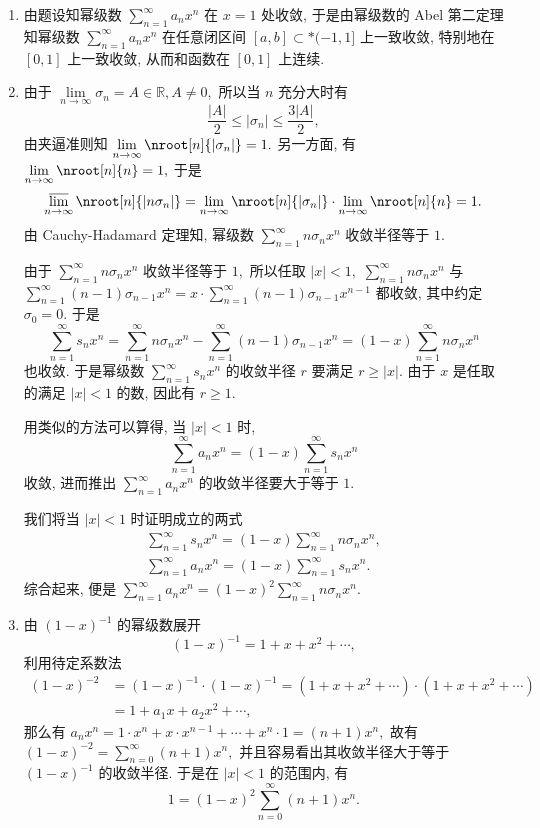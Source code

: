 \begin{solution}
\begin{enumerate}
\item 由题设知幂级数 $\sum\limits_{n=1}^{\infty} a_nx^n$ 在 $x = 1$ 处收敛, 于是由幂级数的 Abel 第二定理知幂级数 $\sum\limits_{n=1}^{\infty} a_nx^n$ 在任意闭区间 $[a, b] \subset* (-1, 1]$ 上一致收敛, 特别地在 $[0, 1]$ 上一致收敛, 从而和函数在 $[0, 1]$ 上连续.
\item 由于 $\lim\limits_{n\to\infty} \sigma_n = A \in \mathbb{R}, A \neq 0,$ 所以当 $n$ 充分大时有
\[\dfrac{\lvert A \rvert}{2} \leqslant \lvert \sigma_n \rvert \leqslant \dfrac{3\lvert A \rvert}{2},\]
由夹逼准则知 $\lim\limits_{n\to\infty} \nroot[n]{\lvert \sigma_n \rvert} = 1.$ 另一方面, 有 $\lim\limits_{n\to\infty} \nroot[n]{n} = 1,$ 于是
\[\varlimsup_{n\to\infty} \nroot[n]{\lvert n\sigma_n \rvert} = \lim\limits_{n\to\infty} \nroot[n]{\lvert \sigma_n \rvert} \cdot \lim\limits_{n\to\infty} \nroot[n]{n} = 1.\]
由 Cauchy-Hadamard 定理知, 幂级数 $\sum\limits_{n=1}^{\infty} n\sigma_n x^n$ 收敛半径等于 $1.$

由于 $\sum\limits_{n=1}^{\infty} n\sigma_n x^n$ 收敛半径等于 $1,$ 所以任取 $\lvert x \rvert < 1,$ $\sum\limits_{n=1}^{\infty} n\sigma_n x^n$ 与 $\sum\limits_{n=1}^{\infty} (n-1) \sigma_{n-1} x^n = x \cdot \sum\limits_{n=1}^{\infty} (n-1) \sigma_{n-1} x^{n-1}$ 都收敛, 其中约定 $\sigma_0 = 0.$ 于是
\[\sum\limits_{n=1}^{\infty} s_n x^n = \sum\limits_{n=1}^{\infty} n\sigma_n x^n - \sum\limits_{n=1}^{\infty} (n-1) \sigma_{n-1} x^n = (1-x) \sum\limits_{n=1}^{\infty} n\sigma_n x^n\]
也收敛. 于是幂级数 $\sum\limits_{n=1}^{\infty} s_n x^n$ 的收敛半径 $r$ 要满足 $r \geqslant \lvert x \rvert.$ 由于 $x$ 是任取的满足 $\lvert x \rvert < 1$ 的数, 因此有 $r \geqslant 1.$

用类似的方法可以算得, 当 $\lvert x \rvert < 1$ 时,
\[\sum\limits_{n=1}^{\infty} a_n x^n = (1 - x) \sum\limits_{n=1}^{\infty} s_n x^n\]
收敛, 进而推出 $\sum\limits_{n=1}^{\infty} a_n x^n$ 的收敛半径要大于等于 $1.$

我们将当 $\lvert x \rvert < 1$ 时证明成立的两式
\begin{gather*}
\sum\limits_{n=1}^{\infty} s_n x^n = (1-x) \sum\limits_{n=1}^{\infty} n\sigma_n x^n, \\
\sum\limits_{n=1}^{\infty} a_n x^n = (1 - x) \sum\limits_{n=1}^{\infty} s_n x^n.
\end{gather*}
综合起来, 便是 $\sum\limits_{n=1}^{\infty} a_n x^n = (1-x)^2 \sum\limits_{n=1}^{\infty} n\sigma_n x^n.$
\item 由 $(1-x)^{-1}$ 的幂级数展开
\[(1-x)^{-1} = 1 + x + x^2 + \cdots,\]
利用待定系数法
\begin{align*}
(1-x)^{-2} & = (1-x)^{-1} \cdot (1-x)^{-1} = (1 + x + x^2 + \cdots) \cdot (1 + x + x^2 + \cdots) \\
& = 1 + a_1x + a_2x^2 + \cdots,
\end{align*}
那么有 $a_nx^n = 1\cdot x^n + x\cdot x^{n-1} + \cdots + x^n\cdot 1 = (n+1) x^n,$
故有 $(1-x)^{-2} = \sum\limits_{n=0}^\infty (n+1) x^n,$ 并且容易看出其收敛半径大于等于 $(1-x)^{-1}$ 的收敛半径. 于是在 $\lvert x \rvert < 1$ 的范围内, 有
\[1 = (1-x)^2 \sum\limits_{n=0}^\infty (n+1) x^n.\]


\end{enumerate}
\end{solution}

